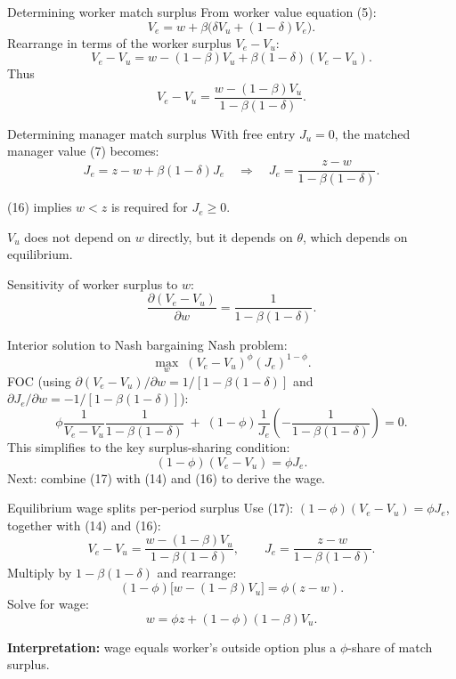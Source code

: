 \documentclass[aspectratio=169,xcolor=dvipsnames]{beamer}
\let\tempone\itemize
\let\temptwo\enditemize
\renewenvironment{itemize}{\tempone\addtolength{\itemsep}{\fill}}{\temptwo}
\begin{document}
\begin{frame}{Determining worker match surplus}
\label{slide:MP_37_WorkerSurplus}
\small
From worker value equation (5):
\[
V_e = w + \beta\Big(\delta V_u + (1-\delta)V_e\Big).
\]
Rearrange in terms of the worker surplus \(V_e-V_u\):
\[
V_e - V_u
= w - (1-\beta)V_u + \beta(1-\delta)(V_e-V_u).
\]
Thus
\[
V_e - V_u
=
\frac{w-(1-\beta)V_u}{1-\beta(1-\delta)}.
\tag{14}
\]
\end{frame}

\begin{frame}{Determining manager match surplus}
\label{slide:MP_38_ManagerSurplus}
\small
With free entry \(J_u=0\), the matched manager value (7) becomes:
\[
J_e = z-w + \beta(1-\delta)J_e
\quad\Rightarrow\quad
J_e=\frac{z-w}{1-\beta(1-\delta)}.
\tag{16}
\]

\begin{itemize}
    \item (16) implies \(w<z\) is required for \(J_e\ge 0\).
    \item \(V_u\) does not depend on \(w\) directly, but it depends on \(\theta\), which depends on equilibrium.
    \item Sensitivity of worker surplus to \(w\):
    \[
        \frac{\partial (V_e-V_u)}{\partial w}=\frac{1}{1-\beta(1-\delta)}.
    \]
\end{itemize}
\end{frame}

\begin{frame}{Interior solution to Nash bargaining}
\label{slide:MP_39_NashFOC}
\small
Nash problem:
\[
\max_{w}\; (V_e-V_u)^{\phi}(J_e)^{1-\phi}.
\tag{12}
\]
FOC (using \(\partial(V_e-V_u)/\partial w = 1/[1-\beta(1-\delta)]\) and \(\partial J_e/\partial w=-1/[1-\beta(1-\delta)]\)):
\[
\phi\frac{1}{V_e-V_u}\frac{1}{1-\beta(1-\delta)}
\;+\;
(1-\phi)\frac{1}{J_e}\left(-\frac{1}{1-\beta(1-\delta)}\right)=0.
\]
This simplifies to the key surplus-sharing condition:
\[
(1-\phi)(V_e-V_u)=\phi J_e.
\tag{17}
\]
Next: combine (17) with (14) and (16) to derive the wage.
\end{frame}

\begin{frame}{Equilibrium wage splits per-period surplus}
\label{slide:MP_40_Wage1}
\small
Use (17): \((1-\phi)(V_e-V_u)=\phi J_e\), together with (14) and (16):
\[
V_e-V_u=\frac{w-(1-\beta)V_u}{1-\beta(1-\delta)},
\qquad
J_e=\frac{z-w}{1-\beta(1-\delta)}.
\]
Multiply by \(1-\beta(1-\delta)\) and rearrange:
\[
(1-\phi)\big[w-(1-\beta)V_u\big] = \phi(z-w).
\]
Solve for wage:
\[
w = \phi z + (1-\phi)(1-\beta)V_u.
\tag{18}
\]

\medskip
\textbf{Interpretation:} wage equals worker's outside option plus a \(\phi\)-share of match surplus.
\end{frame}
\end{document}
